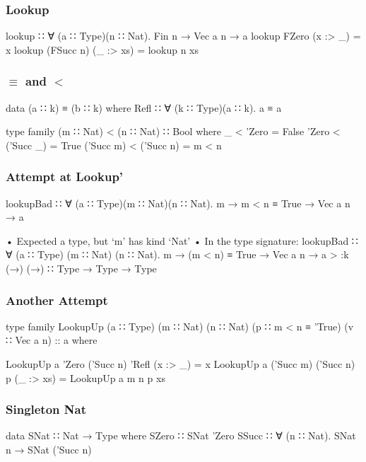 \documentclass{beamer}
\begin{document}
\begin{frame}[fragile]\frametitle{Lookup}
\begin{semiverbatim}
lookup ∷ ∀ (a ∷ Type)(n ∷ Nat). Fin n → Vec a n → a
lookup FZero     (x :> _)  = x
lookup (FSucc n) (_ :> xs) = lookup n xs
\end{semiverbatim}
\end{frame}

\begin{frame}[fragile]\frametitle{$\equiv$ and $<$}
\begin{semiverbatim}
data (a ∷ k) ≡ (b ∷ k) where
  Refl ∷ ∀ (k ∷ Type)(a ∷ k). a ≡ a

type family (m ∷ Nat) < (n ∷ Nat) ∷ Bool where
  _         < 'Zero     = False
  'Zero     < ('Succ _) = True
  ('Succ m) < ('Succ n) = m < n
\end{semiverbatim}
\end{frame}

\begin{frame}[fragile]\frametitle{Attempt at Lookup'}
\begin{semiverbatim}
lookupBad ∷ ∀ (a ∷ Type)(m ∷ Nat)(n ∷ Nat).
            m → m < n ≡ True → Vec a n → a

  • Expected a type, but ‘m’ has kind ‘Nat’
  • In the type signature:
      lookupBad ∷ ∀ (a ∷ Type) (m ∷ Nat) (n ∷ Nat).
                   m → (m < n) ≡ True → Vec a n → a
> :k (→)
(→) ∷ Type → Type → Type
\end{semiverbatim}
\end{frame}

\begin{frame}[fragile]\frametitle{Another Attempt}
\begin{semiverbatim}
  type family LookupUp (a ∷ Type) (m ∷ Nat) (n ∷ Nat)
                       (p ∷ m < n ≡ 'True) 
                       (v ∷ Vec a n) :: a where

  LookupUp a 'Zero     ('Succ n) 'Refl (x :> _)  = x
  LookupUp a ('Succ m) ('Succ n) p     (_ :> xs) =
    LookupUp a m n p xs
\end{semiverbatim}
\end{frame}

\begin{frame}[fragile]\frametitle{Singleton Nat}
\begin{semiverbatim}
data SNat ∷ Nat → Type where
  SZero ∷ SNat 'Zero
  SSucc ∷ ∀ (n ∷ Nat). SNat n → SNat ('Succ n)
\end{semiverbatim}
\end{frame}
\end{document}
